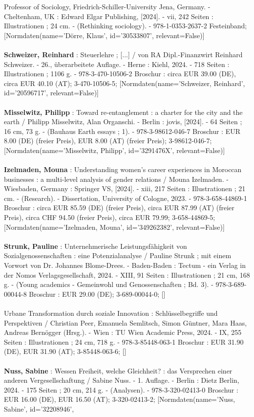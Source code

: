 \documentclass{article}
\begin{document}
\begin{multicols}{3}
Professor of Sociology, Friedrich-Schiller-University Jena, Germany. - Cheltenham, UK : Edward Elgar Publishing, [2024]. - vii, 242 Seiten : Illustrationen ; 24 cm. - (Rethinking sociology). - 978-1-0353-2637-2 Festeinband; [Normdaten(name='Dörre, Klaus', id='30533807', relevant=False)]\\\\\textbf{Schweizer, Reinhard} : Steuerlehre ; [...] / von RA Dipl.-Finanzwirt Reinhard Schweizer. - 26., überarbeitete Auflage. - Herne : Kiehl, 2024. - 718 Seiten : Illustrationen ; 1106 g. - 978-3-470-10506-2 Broschur : circa EUR 39.00 (DE), circa EUR 40.10 (AT); 3-470-10506-5; [Normdaten(name='Schweizer, Reinhard', id='20596717', relevant=False)]\\\\\textbf{Misselwitz, Philipp} : Toward re-entanglement : a charter for the city and the earth / Philipp Misselwitz, Alan Organschi. - Berlin : jovis, [2024]. - 64 Seiten ; 16 cm, 73 g. - (Bauhaus Earth essays ; 1). - 978-3-98612-046-7 Broschur : EUR 8.00 (DE) (freier Preis), EUR 8.00 (AT) (freier Preis); 3-98612-046-7; [Normdaten(name='Misselwitz, Philipp', id='3291476X', relevant=False)]\\\\\textbf{Izelmaden, Mouna} : Understanding women's career experiences in Moroccan businesses : a multi-level analysis of gender relations / Mouna Izelmaden. - Wiesbaden, Germany : Springer VS, [2024]. - xiii, 217 Seiten : Illustrationen ; 21 cm. - (Research). - Dissertation, University of Cologne, 2023. - 978-3-658-44869-1 Broschur : circa EUR 85.59 (DE) (freier Preis), circa EUR 87.99 (AT) (freier Preis), circa CHF 94.50 (freier Preis), circa EUR 79.99; 3-658-44869-5; [Normdaten(name='Izelmaden, Mouna', id='349262382', relevant=False)]\\\\\textbf{Strunk, Pauline} : Unternehmerische Leistungsfähigkeit von Sozialgenossenschaften : eine Potenzialanalyse / Pauline Strunk ; mit einem Vorwort von Dr. Johannes Blome-Drees. - Baden-Baden : Tectum - ein Verlag in der Nomos Verlagsgesellschaft, 2024. - XIII, 91 Seiten : Illustrationen ; 21 cm, 168 g. - (Young academics - Gemeinwohl und Genossenschaften ; Bd. 3). - 978-3-689-00044-8 Broschur : EUR 29.00 (DE); 3-689-00044-0; []\\\\Urbane Transformation durch soziale Innovation : Schlüsselbegriffe und Perspektiven / Christian Peer, Emanuela Semlitsch, Simon Güntner, Mara Haas, Andreas Bernögger (Hrsg.). - Wien : TU Wien Academic Press, 2024. - IX, 255 Seiten : Illustrationen ; 24 cm, 718 g. - 978-3-85448-063-1 Broschur : EUR 31.90 (DE), EUR 31.90 (AT); 3-85448-063-6; []\\\\\textbf{Nuss, Sabine} : Wessen Freiheit, welche Gleichheit? : das Versprechen einer anderen Vergesellschaftung / Sabine Nuss. - 1. Auflage. - Berlin : Dietz Berlin, 2024. - 175 Seiten ; 20 cm, 214 g. - (Analysen). - 978-3-320-02413-0 Broschur : EUR 16.00 (DE), EUR 16.50 (AT); 3-320-02413-2; [Normdaten(name='Nuss, Sabine', id='32208946', 
\end{multicols}
\end{document}
